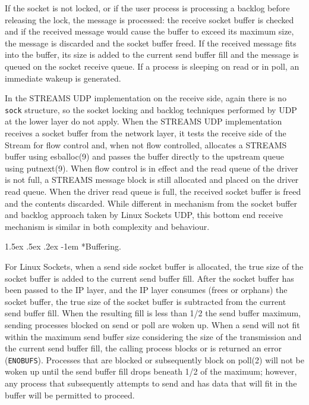 \documentclass[letterpaper,final,notitlepage,twocolumn,10pt,twoside]{article}
\makeatletter
\renewcommand\paragraph{\@startsection{paragraph}{4}{\z@}%
                                    {1.5ex \@plus .5ex \@minus .2ex}%
                                    {-1em}%
                                    {\normalfont\normalsize\bfseries\slshape}}
\makeatother
\begin{document}
If the socket is not locked, or if the user process is processing a backlog before releasing the
lock, the message is processed: the receive socket buffer is checked and if the received message
would cause the buffer to exceed its maximum size, the message is discarded and the socket buffer
freed.  If the received message fits into the buffer, its size is added to the current send buffer
fill and the message is queued on the socket receive queue.  If a process is sleeping on read or in
poll, an immediate wakeup is generated.

In the STREAMS UDP implementation on the receive side, again there is no \texttt{sock} structure,
so the socket locking and backlog techniques performed by UDP at the lower layer do not apply.
When the STREAMS UDP implementation receives a socket buffer from the network layer, it tests the
receive side of the Stream for flow control and, when not flow controlled, allocates a STREAMS
buffer using esballoc(9) and passes the buffer directly to the upstream queue using putnext(9).
When flow control is in effect and the read queue of the driver is not full, a STREAMS message block
is still allocated and placed on the driver read queue.  When the driver read queue is full, the
received socket buffer is freed and the contents discarded.  While different in mechanism from the
socket buffer and backlog approach taken by Linux Sockets UDP, this bottom end receive mechanism is
similar in both complexity and behaviour.

\paragraph*{Buffering.}

For Linux Sockets, when a send side socket buffer is allocated, the true size of the socket buffer
is added to the current send buffer fill.  After the socket buffer has been passed to the IP layer,
and the IP layer consumes (frees or orphans) the socket buffer, the true size of the socket buffer
is subtracted from the current send buffer fill.  When the resulting fill is less than 1/2 the send
buffer maximum, sending processes blocked on send or poll are woken up.  When a send will not fit
within the maximum send buffer size considering the size of the transmission and the current send
buffer fill, the calling process blocks or is returned an error (\texttt{ENOBUFS}).  Processes that
are blocked or subsequently block on poll(2) will not be woken up until the send buffer fill drops
beneath 1/2 of the maximum; however, any process that subsequently attempts to send and has data
that will fit in the buffer will be permitted to proceed.
\end{document}
